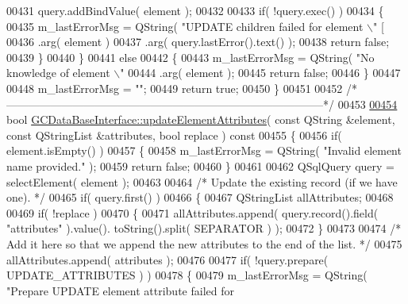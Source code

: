 \begin{DoxyCode}
{{{{{{{{{{{{{{{{{00431     query.addBindValue( element );
00432 
00433     \textcolor{keywordflow}{if}( !query.exec() )
00434     \{
00435       m\_lastErrorMsg = QString( \textcolor{stringliteral}{"UPDATE children failed for element \(\backslash\)"%
       [%
00436           .arg( element )
00437           .arg( query.lastError().text() );
00438       \textcolor{keywordflow}{return} \textcolor{keyword}{false};
00439     \}
00440   \}
00441   \textcolor{keywordflow}{else}
00442   \{
00443     m\_lastErrorMsg = QString( \textcolor{stringliteral}{"No knowledge of element \(\backslash\)"%
00444         .arg( element );
00445     \textcolor{keywordflow}{return} \textcolor{keyword}{false};
00446   \}
00447 
00448   m\_lastErrorMsg = \textcolor{stringliteral}{""};
00449   \textcolor{keywordflow}{return} \textcolor{keyword}{true};
00450 \}
00451 
00452 \textcolor{comment}{/*
      --------------------------------------------------------------------------------------*/}
00453 
\hypertarget{gcdatabaseinterface_8cpp_source_l00454}{}\hyperlink{class_g_c_data_base_interface_abc13d0cb75b233fd83575bfef575ff19}{00454} \textcolor{keywordtype}{bool} \hyperlink{class_g_c_data_base_interface_abc13d0cb75b233fd83575bfef575ff19}{GCDataBaseInterface::updateElementAttributes}( \textcolor{keyword}{const} QString &element, \textcolor{keyword}{
      const} QStringList &attributes, \textcolor{keywordtype}{bool} replace )\textcolor{keyword}{ const}
00455 \textcolor{keyword}{}\{
00456   \textcolor{keywordflow}{if}( element.isEmpty() )
00457   \{
00458     m\_lastErrorMsg = QString( \textcolor{stringliteral}{"Invalid element name provided."} );
00459     \textcolor{keywordflow}{return} \textcolor{keyword}{false};
00460   \}
00461 
00462   QSqlQuery query = selectElement( element );
00463 
00464   \textcolor{comment}{/* Update the existing record (if we have one). */}
00465   \textcolor{keywordflow}{if}( query.first() )
00466   \{
00467     QStringList allAttributes;
00468 
00469     \textcolor{keywordflow}{if}( !replace )
00470     \{
00471       allAttributes.append( query.record().field( \textcolor{stringliteral}{"attributes"} ).value().
      toString().split( SEPARATOR ) );
00472     \}
00473 
00474     \textcolor{comment}{/* Add it here so that we append the new attributes to the end of the list.
       */}
00475     allAttributes.append( attributes );
00476 
00477     \textcolor{keywordflow}{if}( !query.prepare( UPDATE\_ATTRIBUTES ) )
00478     \{
00479       m\_lastErrorMsg = QString( \textcolor{stringliteral}{"Prepare UPDATE element attribute failed for
}}}}}}}}}}}}}}}}}}}}
\end{DoxyCode}
